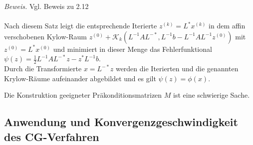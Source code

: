     \textit{Beweis.} Vgl. Beweis zu 2.12 \\ \\
    Nach diesem Satz leigt die entsprechende Iterierte $z^{(k)}=L^*x^{(k)}$ in dem affin verschobenen Kylow-Raum
    $z^{(0)} + \mathcal{K}_k(L^{-1}AL^{-*}, L^{-1}b-L^{-1}AL^{-1}z^{(0)})$ mit $z^{(0)} = L^*x^{(0)}$ 
    und minimiert in dieser Menge das Fehlerfunktional $\psi(z) = \tfrac{1}{2}L^{-1}AL^{-*}z-z^*L^{-1}b$.  \\
    Durch die Transformierte $x=L^{-*}z$ werden die Iterierten und die genannten Krylow-Räume aufeinander abgebildet
    und es gilt $\psi(z) = \phi(x)$.
    \begin{rembox}
        Die Konstruktion geeigneter Präkonditionsmatrizen $M$ ist eine schwierige Sache.
    \end{rembox}
    \subsection{Anwendung und Konvergenzgeschwindigkeit des CG-Verfahren}
